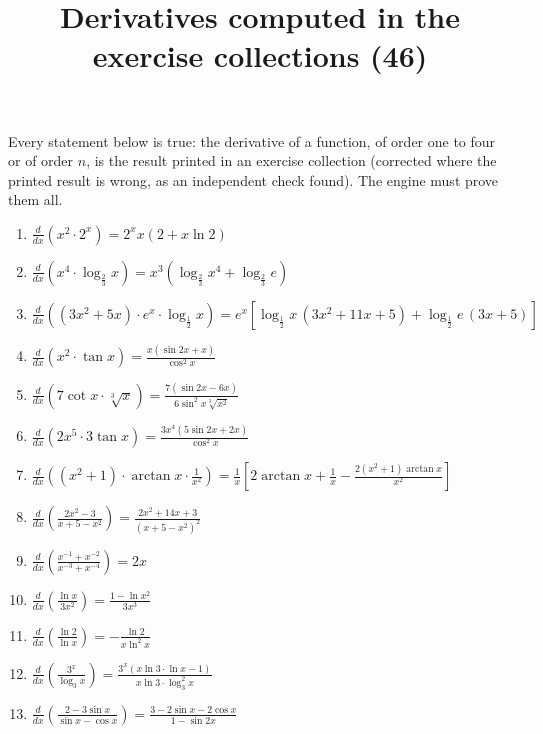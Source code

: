 \documentclass[11pt,a4paper]{article}
\title{Derivatives computed in the exercise collections (46)}
\author{}
\date{}
\begin{document}
\maketitle
Every statement below is true: the derivative of a function, of order one to four or of order $n$, is the result printed in an exercise collection (corrected where the printed result is wrong, as an independent check found). The engine must prove them all.

\begin{enumerate}
\item $\displaystyle \frac{d}{dx}\left( x^{2} \cdot 2^{x} \right) = 2^{x} x(2 + x\ln 2)$
\item $\displaystyle \frac{d}{dx}\left( x^{4} \cdot \log_{\frac{2}{3}} x \right) = x^{3}\left(\log_{\frac{2}{3}} x^{4} + \log_{\frac{2}{3}} e\right)$
\item $\displaystyle \frac{d}{dx}\left( (3x^{2} + 5x) \cdot e^{x} \cdot \log_{\frac{1}{2}} x \right) = e^{x}\left[\log_{\frac{1}{2}} x\,(3x^{2} + 11x + 5) + \log_{\frac{1}{2}} e\,(3x + 5)\right]$
\item $\displaystyle \frac{d}{dx}\left( x^{2} \cdot \tan x \right) = \frac{x(\sin 2x + x)}{\cos^{2} x}$
\item $\displaystyle \frac{d}{dx}\left( 7\cot x \cdot \sqrt[3]{x} \right) = \frac{7(\sin 2x - 6x)}{6\sin^{2} x\sqrt[3]{x^{2}}}$
\item $\displaystyle \frac{d}{dx}\left( 2x^{5} \cdot 3\tan x \right) = \frac{3x^{4}(5\sin 2x + 2x)}{\cos^{2} x}$
\item $\displaystyle \frac{d}{dx}\left( (x^{2} + 1) \cdot \arctan x \cdot \frac{1}{x^{2}} \right) = \frac{1}{x}\left[2\arctan x + \frac{1}{x} - \frac{2(x^{2} + 1)\arctan x}{x^{2}}\right]$
\item $\displaystyle \frac{d}{dx}\left( \frac{2x^{2} - 3}{x + 5 - x^{2}} \right) = \frac{2x^{2} + 14x + 3}{(x + 5 - x^{2})^{2}}$
\item $\displaystyle \frac{d}{dx}\left( \frac{x^{-1} + x^{-2}}{x^{-3} + x^{-4}} \right) = 2x$
\item $\displaystyle \frac{d}{dx}\left( \frac{\ln x}{3x^{2}} \right) = \frac{1 - \ln x^{2}}{3x^{3}}$
\item $\displaystyle \frac{d}{dx}\left( \frac{\ln 2}{\ln x} \right) = -\frac{\ln 2}{x\ln^{2} x}$
\item $\displaystyle \frac{d}{dx}\left( \frac{3^{x}}{\log_{3} x} \right) = \frac{3^{x}(x\ln 3 \cdot \ln x - 1)}{x\ln 3 \cdot \log_{3}^{2} x}$
\item $\displaystyle \frac{d}{dx}\left( \frac{2 - 3\sin x}{\sin x - \cos x} \right) = \frac{3 - 2\sin x - 2\cos x}{1 - \sin 2x}$

\end{enumerate}
\end{document}

